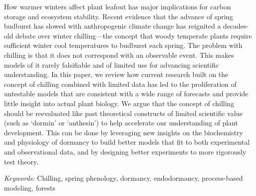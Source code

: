 \documentclass[11pt]{article}
\begin{document}
How warmer winters affect plant leafout has major implications for carbon storage and ecosystem stability. Recent evidence that the advance of spring budburst has slowed with anthropogenic climate change has reignited a decades-old debate over winter chilling---the concept that woody temperate plants require sufficient winter cool temperatures to budburst each spring. The problem with chilling is that it does not correspond with an observable event.  This makes models of it rarely falsifiable and of limited use for advancing scientific understanding. In this paper, we review how current research built on the concept of chilling combined with limited data has led to the proliferation of untestable models that are consistent with a wide range of forecasts and provide little insight into actual plant biology. We argue that the concept of chilling should be reevaluated like past theoretical constructs of limited scientific value (such as `dormin' or  `anthesin') to help accelerate our understanding of plant development. This can be done by leveraging new insights on the biochemistry and physiology of dormancy to build better models that fit to both experimental and observational data, and by designing better experiments to more rigorously test theory. %


\emph{Keywords:} Chilling, spring phenology, dormancy, endodormancy, process-based modeling, forests

\end{document}
